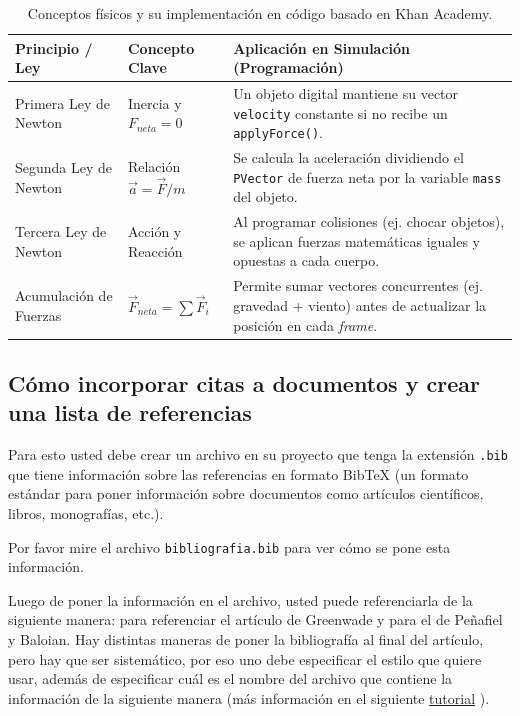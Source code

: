 \documentclass{article}
\begin{document}
\begin{table}[h]
	\centering
	\begin{tabular}{|l|p{4cm}|p{6.5cm}|}
		\hline
		\textbf{Principio / Ley} & \textbf{Concepto Clave}           & \textbf{Aplicación en Simulación (Programación)}                                                                    \\ \hline
		Primera Ley de Newton    & Inercia y $F_{neta} = 0$          & Un objeto digital mantiene su vector \texttt{velocity} constante si no recibe un \texttt{applyForce()}.             \\ \hline
		Segunda Ley de Newton    & Relación $\vec{a} = \vec{F}/m$    & Se calcula la aceleración dividiendo el \texttt{PVector} de fuerza neta por la variable \texttt{mass} del objeto.   \\ \hline
		Tercera Ley de Newton    & Acción y Reacción                 & Al programar colisiones (ej. chocar objetos), se aplican fuerzas matemáticas iguales y opuestas a cada cuerpo.      \\ \hline
		Acumulación de Fuerzas   & $\vec{F}_{neta} = \sum \vec{F}_i$ & Permite sumar vectores concurrentes (ej. gravedad + viento) antes de actualizar la posición en cada \textit{frame}. \\ \hline
	\end{tabular}
	\caption{\label{tab:leyes_newton}Conceptos físicos y su implementación en código basado en Khan Academy.}
\end{table}

\subsection{Cómo incorporar citas a documentos y crear una lista de referencias}

Para esto usted debe crear un archivo en su proyecto que tenga la extensión \verb|.bib| que tiene información sobre las referencias en formato BibTeX (un formato estándar para poner información sobre documentos como artículos científicos, libros, monografías, etc.).

Por favor mire el archivo \verb|bibliografia.bib| para ver cómo se pone esta información.

Luego de poner la información en el archivo, usted puede referenciarla de la siguiente manera: \cite{greenwade93} para referenciar el artículo de Greenwade y \cite{Pen2021} para el de Peñafiel y Baloian. Hay distintas maneras de poner la bibliografía al final del artículo, pero hay que ser sistemático, por eso uno debe especificar el estilo que quiere usar, además de especificar cuál es el nombre del archivo que contiene la información de la siguiente manera (más información en el siguiente \href{https://www.overleaf.com/help/97-how-to-include-a-bibliography-using-bibtex}{tutorial} ). \cite{penafiel2020applying}

\newpage

\end{document}
